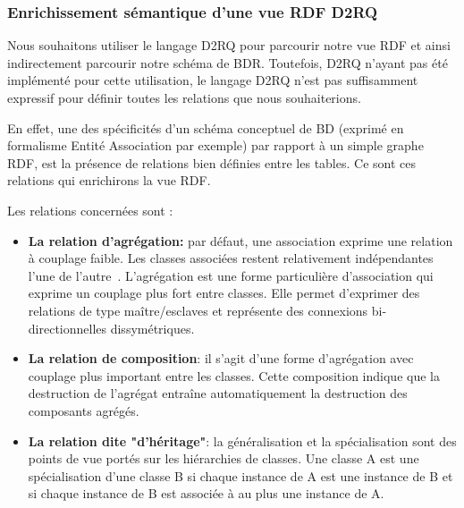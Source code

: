 \subsubsection*{Enrichissement sémantique d'une vue RDF D2RQ}
Nous souhaitons utiliser le langage D2RQ pour parcourir notre vue RDF et ainsi indirectement parcourir notre schéma de BDR. Toutefois, D2RQ n'ayant pas été implémenté pour cette utilisation, le langage D2RQ n'est pas suffisamment expressif pour définir toutes les relations que nous souhaiterions. 


En effet, une des spécificités d'un schéma conceptuel de BD (exprimé en formalisme Entité Association par exemple) par rapport à un simple graphe RDF, est la présence de relations bien définies entre les tables. Ce sont ces relations qui enrichirons la vue RDF. 

Les relations concernées sont :\\
\begin{itemize}
\item \textbf{La relation d'agrégation:}
par défaut, une association exprime une relation à couplage faible. Les classes associées restent relativement indépendantes l'une de l'autre~\cite{modelisation_2002}. L'agrégation est une forme particulière d'association qui exprime un couplage plus fort entre classes. Elle permet d'exprimer des relations de type maître/esclaves et représente des connexions bi-directionnelles dissymétriques. \\
\item \textbf{La relation de composition}: il s'agit d'une forme d'agrégation avec couplage plus important entre les classes. Cette composition indique que la destruction de l'agrégat entraîne automatiquement la destruction des composants agrégés.\\
\item \textbf{La relation dite "d'héritage"}: la généralisation et la spécialisation sont des points de vue portés sur les hiérarchies de classes. Une classe A est une spécialisation d'une classe B si chaque instance de A est une instance de B et si chaque instance de B est associée à au plus une instance de A.\\

\end{itemize}

